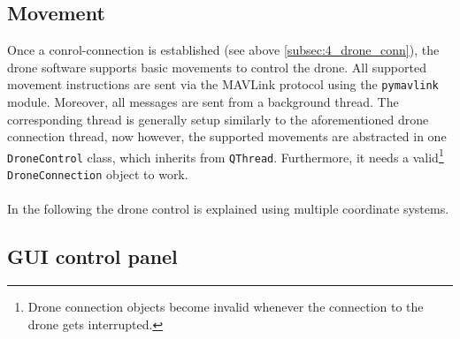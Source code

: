 \subsection{Movement}\label{subsec:4_drone_mvmnt}
Once a conrol-connection is established (see above
\autoref{subsec:4_drone_conn}), the drone software supports basic movements to
control the drone.
All supported movement instructions are sent via the MAVLink protocol using
the \texttt{pymavlink} module.
Moreover, all messages are sent from a background thread.
The corresponding thread is generally setup similarly to the aforementioned
drone connection thread, now however, the supported movements are
abstracted in one \texttt{DroneControl} class, which inherits from
\texttt{QThread}.
Furthermore, it needs a valid\footnote{Drone connection objects become
invalid whenever the connection to the drone gets interrupted.} 
\texttt{DroneConnection} object to work.\\\\
\noindent In the following the drone control is explained using multiple
coordinate systems.

\subsection{GUI control panel}\label{subsec:4_drone_ctrl_panel_gui}
